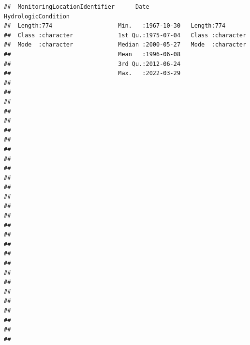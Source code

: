 \documentclass[
  12pt,
]{article}
\begin{document}
\begin{verbatim}
##  MonitoringLocationIdentifier      Date            HydrologicCondition
##  Length:774                   Min.   :1967-10-30   Length:774         
##  Class :character             1st Qu.:1975-07-04   Class :character   
##  Mode  :character             Median :2000-05-27   Mode  :character   
##                               Mean   :1996-06-08                      
##                               3rd Qu.:2012-06-24                      
##                               Max.   :2022-03-29                      
##                                                                       
##                                                                       
##                                                                       
##                                                                       
##                                                                       
##                                                                       
##                                                                       
##                                                                       
##                                                                       
##                                                                       
##                                                                       
##                                                                       
##                                                                       
##                                                                       
##                                                                       
##                                                                       
##                                                                       
##                                                                       
##                                                                       
##                                                                       
##                                                                       
##                                                                       
##                                                                       
##                                                                       
##                                                                       
##                                                                       
##                                                                       
##                                                                       

\end{verbatim}
\end{document}
